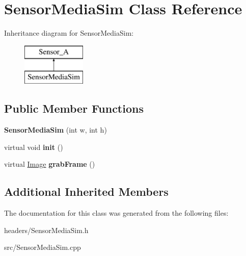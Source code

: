 \hypertarget{class_sensor_media_sim}{\section{Sensor\-Media\-Sim Class Reference}
\label{class_sensor_media_sim}
}
Inheritance diagram for Sensor\-Media\-Sim\-:\begin{figure}[H]
\begin{center}
\leavevmode
\includegraphics[height=2.000000cm]{class_sensor_media_sim}
\end{center}
\end{figure}
\subsection*{Public Member Functions}
\begin{DoxyCompactItemize}
\item 
\hypertarget{class_sensor_media_sim_a5d1747ddc21cdcd57c6692a43149cd12}{{\bfseries Sensor\-Media\-Sim} (int w, int h)}\label{class_sensor_media_sim_a5d1747ddc21cdcd57c6692a43149cd12}

\item 
\hypertarget{class_sensor_media_sim_aada0e757b438d9bf83e54a017fd0dfac}{virtual void {\bfseries init} ()}\label{class_sensor_media_sim_aada0e757b438d9bf83e54a017fd0dfac}

\item 
\hypertarget{class_sensor_media_sim_ad5ed2570d1aaf799aad3b9fd787f1c81}{virtual \hyperlink{class_image}{Image} {\bfseries grab\-Frame} ()}\label{class_sensor_media_sim_ad5ed2570d1aaf799aad3b9fd787f1c81}

\end{DoxyCompactItemize}
\subsection*{Additional Inherited Members}


The documentation for this class was generated from the following files\-:\begin{DoxyCompactItemize}
\item 
headers/Sensor\-Media\-Sim.\-h\item 
src/Sensor\-Media\-Sim.\-cpp\end{DoxyCompactItemize}
